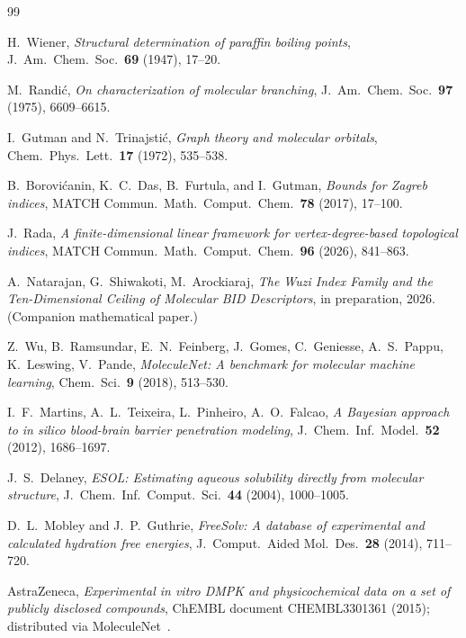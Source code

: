 \documentclass[11pt,a4paper]{article}
\theoremstyle{definition}
\begin{document}
\begin{thebibliography}{99}
\small

H.~Wiener,
\emph{Structural determination of paraffin boiling points},
J.~Am.~Chem.~Soc.~\textbf{69} (1947), 17--20.

M.~Randi\'c,
\emph{On characterization of molecular branching},
J.~Am.~Chem.~Soc.~\textbf{97} (1975), 6609--6615.

I.~Gutman and N.~Trinajsti\'c,
\emph{Graph theory and molecular orbitals},
Chem.~Phys.~Lett.~\textbf{17} (1972), 535--538.

B.~Borovi\'canin, K.~C.~Das, B.~Furtula, and I.~Gutman,
\emph{Bounds for Zagreb indices},
MATCH Commun.~Math.~Comput.~Chem.~\textbf{78} (2017), 17--100.

J.~Rada,
\emph{A finite-dimensional linear framework for vertex-degree-based
topological indices},
MATCH Commun.~Math.~Comput.~Chem.~\textbf{96} (2026), 841--863.

A.~Natarajan, G.~Shiwakoti, M.~Arockiaraj,
\emph{The Wuzi Index Family and the Ten-Dimensional Ceiling of Molecular BID Descriptors},
in preparation, 2026. (Companion mathematical paper.)

Z.~Wu, B.~Ramsundar, E.~N.~Feinberg, J.~Gomes, C.~Geniesse,
A.~S.~Pappu, K.~Leswing, V.~Pande,
\emph{MoleculeNet: A benchmark for molecular machine learning},
Chem.~Sci.~\textbf{9} (2018), 513--530.

I.~F.~Martins, A.~L.~Teixeira, L.~Pinheiro, A.~O.~Falcao,
\emph{A Bayesian approach to in silico blood-brain barrier
penetration modeling},
J.~Chem.~Inf.~Model.~\textbf{52} (2012), 1686--1697.

J.~S.~Delaney,
\emph{ESOL: Estimating aqueous solubility directly from molecular structure},
J.~Chem.~Inf.~Comput.~Sci.~\textbf{44} (2004), 1000--1005.

D.~L.~Mobley and J.~P.~Guthrie,
\emph{FreeSolv: A database of experimental and calculated hydration free energies},
J.~Comput.~Aided Mol.~Des.~\textbf{28} (2014), 711--720.

AstraZeneca, \emph{Experimental in vitro DMPK and physicochemical data
on a set of publicly disclosed compounds},
ChEMBL document CHEMBL3301361 (2015);
distributed via MoleculeNet~\cite{MoleculeNet}.


\end{thebibliography}
\end{document}
